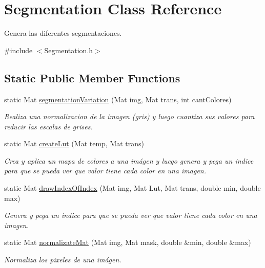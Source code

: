 \hypertarget{classSegmentation}{}\section{Segmentation Class Reference}
\label{classSegmentation}


Genera las diferentes segmentaciones.  




{\ttfamily \#include $<$Segmentation.\+h$>$}

\subsection*{Static Public Member Functions}
\begin{DoxyCompactItemize}
\item 
static Mat \mbox{\hyperlink{classSegmentation_a68ad8bc7035c2e0b5f09f8d264b418bc}{segmentation\+Variation}} (Mat img, Mat trans, int cant\+Colores)
\begin{DoxyCompactList}\small\item\em Realiza una normalizacion de la imagen (gris) y luego cuantiza sus valores para reducir las escalas de grises. \end{DoxyCompactList}\item 
static Mat \mbox{\hyperlink{classSegmentation_aa15a21553b49e70fc2ee5a3be3ff9695}{create\+Lut}} (Mat temp, Mat trans)
\begin{DoxyCompactList}\small\item\em Crea y aplica un mapa de colores a una imágen y luego genera y pega un indice para que se pueda ver que valor tiene cada color en una imagen. \end{DoxyCompactList}\item 
static Mat \mbox{\hyperlink{classSegmentation_a0894154b8202a84decfdd991dda750c1}{draw\+Index\+Of\+Index}} (Mat img, Mat Lut, Mat trans, double min, double max)
\begin{DoxyCompactList}\small\item\em Genera y pega un indice para que se pueda ver que valor tiene cada color en una imagen. \end{DoxyCompactList}\item 
static Mat \mbox{\hyperlink{classSegmentation_a4f43910a97bc9b895ef3796e5ab6eb5a}{normalizate\+Mat}} (Mat img, Mat mask, double \&min, double \&max)
\begin{DoxyCompactList}\small\item\em Normaliza los pixeles de una imágen. \end{DoxyCompactList}\item 

\end{DoxyCompactItemize}
